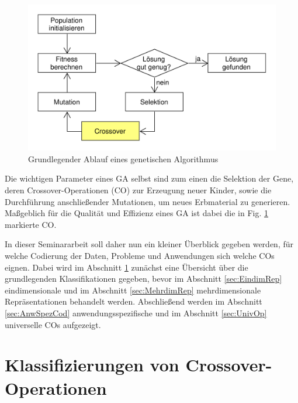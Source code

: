 \documentclass{llncs}
\begin{document}
	\begin{figure}
		\centering
		\includegraphics[width=.8\columnwidth]{./Figures/GA-Prinzip.pdf}
		\caption{Grundlegender Ablauf eines genetischen Algorithmus}
		\label{fig:abb1}
	\end{figure}	
	
	Die wichtigen Parameter eines GA selbst sind zum einen die Selektion der Gene, deren Crossover-Operationen (CO) zur Erzeugung neuer Kinder, sowie die Durch\-füh\-rung anschließender Mutationen, um neues Erbmaterial zu generieren. Maßgeblich für die Qualität und Effizienz eines GA ist dabei die in Fig. \ref{fig:abb1} markierte CO.
	
	In dieser Seminararbeit soll daher nun ein kleiner Überblick gegeben werden, für welche Codierung der Daten, Probleme und Anwendungen sich welche COs eignen.
	Dabei wird im Abschnitt \ref{sec:KlassCO} zunächst eine Übersicht über die grundlegenden Klassifikationen gegeben, bevor im Abschnitt \ref{sec:EindimRep} eindimensionale und im Abschnitt \ref{sec:MehrdimRep} mehrdimensionale Repräsentationen behandelt werden. Abschließend werden im Abschnitt \ref{sec:AnwSpezCod} anwendungsspezifische und im Abschnitt \ref{sec:UnivOp} universelle COs aufgezeigt.

\section{Klassifizierungen von Crossover-Operationen}
\label{sec:KlassCO}
\end{document}

